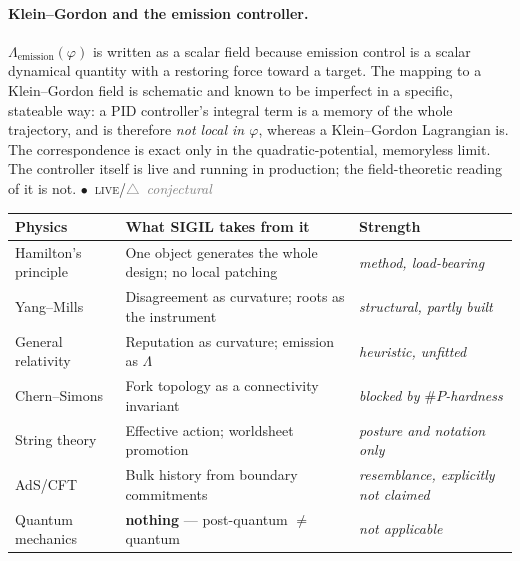 \documentclass[10pt,a4paper]{article}
\newcommand{\stC}{{\scriptsize\textcolor{gray}{$\triangle$~\textit{conjectural}}}}
\newcommand{\stL}{\textcolor{sigilcyan}{$\bullet$}~{\scriptsize\textcolor{sigilcyan}{\textsc{live}}}}
\begin{document}
\paragraph{Klein--Gordon and the emission controller.}
$\Lambda_{\mathrm{emission}}(\varphi)$ is written as a scalar field because emission control
is a scalar dynamical quantity with a restoring force toward a target. The mapping to a
Klein--Gordon field is schematic and known to be imperfect in a specific, stateable way: a
PID controller's integral term is a memory of the whole trajectory, and is therefore
\emph{not local in $\varphi$}, whereas a Klein--Gordon Lagrangian is. The correspondence is
exact only in the quadratic-potential, memoryless limit. The controller itself is live and
running in production; the field-theoretic reading of it is not. \stL/\stC

\begin{center}
\small
{}
\renewcommand{\arraystretch}{1.4}
\begin{tabularx}{\textwidth}{@{}l>{\RaggedRight\arraybackslash}X l@{}}
\toprule
Physics & What SIGIL takes from it & Strength \\
\midrule
Hamilton's principle & One object generates the whole design; no local patching &
  \emph{method, load-bearing} \\
Yang--Mills & Disagreement as curvature; roots as the instrument &
  \emph{structural, partly built} \\
General relativity & Reputation as curvature; emission as $\Lambda$ &
  \emph{heuristic, unfitted} \\
Chern--Simons & Fork topology as a connectivity invariant &
  \emph{blocked by $\#P$-hardness} \\
String theory & Effective action; worldsheet promotion &
  \emph{posture and notation only} \\
AdS/CFT & Bulk history from boundary commitments &
  \emph{resemblance, explicitly not claimed} \\
Quantum mechanics & \textbf{nothing} --- post-quantum $\neq$ quantum &
  \emph{not applicable} \\
\bottomrule
\end{tabularx}
\end{center}
\end{document}
